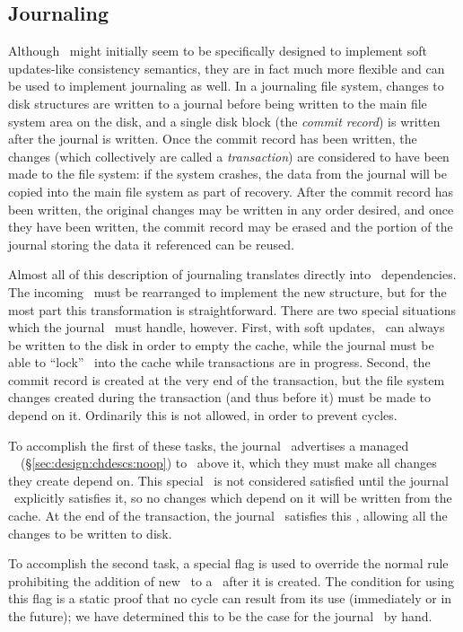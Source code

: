 \subsection{Journaling}
\label{sec:consistency:journal}

Although \chdescs\ might initially seem to be specifically designed to implement
soft updates-like consistency semantics, they are in fact much more flexible and
can be used to implement journaling as well. In a journaling file system,
changes to disk structures are written to a journal before being written to the
main file system area on the disk, and a single disk block (the \emph{commit
record}) is written after the journal is written. Once the commit record has
been written, the changes (which collectively are called a \emph{transaction})
are considered to have been made to the file system: if the system crashes, the
data from the journal will be copied into the main file system as part of
recovery. After the commit record has been written, the original changes may be
written in any order desired, and once they have been written, the commit record
may be erased and the portion of the journal storing the data it referenced can
be reused.

Almost all of this description of journaling translates directly into \chdesc\
dependencies. The incoming \chdescs\ must be rearranged to implement the new
structure, but for the most part this transformation is straightforward. There
are two special situations which the journal \module\ must handle, however.
First, with soft updates, \chdescs\ can always be written to the disk in order
to empty the cache, while the journal must be able to ``lock'' \chdescs\ into
the cache while transactions are in progress. Second, the commit record is
created at the very end of the transaction, but the file system changes created
during the transaction (and thus before it) must be made to depend on it.
Ordinarily this is not allowed, in order to prevent cycles.

To accomplish the first of these tasks, the journal \module\ advertises a
managed \noop\ \chdesc\ (\S\ref{sec:design:chdescs:noop}) to \modules\ above it,
which they must make all changes they create depend on. This special \chdesc\ is
not considered satisfied until the journal \module\ explicitly satisfies it, so
no changes which depend on it will be written from the cache.  At the end of the
transaction, the journal \module\ satisfies this \chdesc, allowing all the
changes to be written to disk.

To accomplish the second task, a special flag is used to override the normal
rule prohibiting the addition of new \befores\ to a \chdesc\ after it is
created. The condition for using this flag is a static proof that no cycle can
result from its use (immediately or in the future); we have determined this to
be the case for the journal \module\ by hand.

